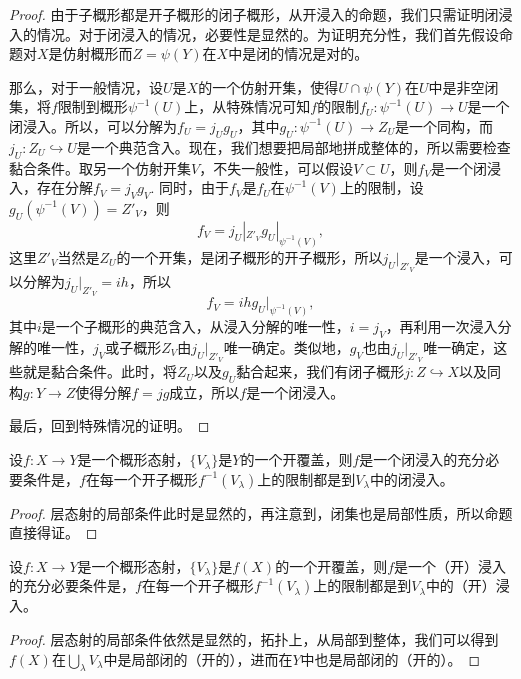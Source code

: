 \begin{proof}
由于子概形都是开子概形的闭子概形，从开浸入的命题，我们只需证明闭浸入的情况。对于闭浸入的情况，必要性是显然的。为证明充分性，我们首先假设命题对$X$是仿射概形而$Z=\psi(Y)$在$X$中是闭的情况是对的。

那么，对于一般情况，设$U$是$X$的一个仿射开集，使得$U\cap \psi(Y)$在$U$中是非空闭集，将$f$限制到概形$\psi^{-1}(U)$上，从特殊情况可知$f$的限制$f_U:\psi^{-1}(U)\to U$是一个闭浸入。所以，可以分解为$f_U=j_Ug_U$，其中$g_U:\psi^{-1}(U)\to Z_U$是一个同构，而$j_U:Z_U\hookrightarrow U$是一个典范含入。现在，我们想要把局部地拼成整体的，所以需要检查黏合条件。取另一个仿射开集$V$，不失一般性，可以假设$V\subset U$，则$f_V$是一个闭浸入，存在分解$f_V=j_Vg_V$. 同时，由于$f_V$是$f_U$在$\psi^{-1}(V)$上的限制，设$g_U(\psi^{-1}(V))=Z'_V$，则
\[
	f_V=j_U|_{Z'_V}g_U|_{\psi^{-1}(V)},
\]
这里$Z'_V$当然是$Z_U$的一个开集，是闭子概形的开子概形，所以$j_U|_{Z'_V}$是一个浸入，可以分解为$j_U|_{Z'_V}=ih$，所以
\[
	f_V=ihg_U|_{\psi^{-1}(V)},
\]
其中$i$是一个子概形的典范含入，从浸入分解的唯一性，$i=j_V$，再利用一次浸入分解的唯一性，$j_V$或子概形$Z_V$由$j_U|_{Z'_V}$唯一确定。类似地，$g_V$也由$j_U|_{Z'_V}$唯一确定，这些就是黏合条件。此时，将$Z_U$以及$g_U$黏合起来，我们有闭子概形$j:Z\hookrightarrow X$以及同构$g:Y\to Z$使得分解$f=jg$成立，所以$f$是一个闭浸入。

最后，回到特殊情况的证明。\notprove
\end{proof}

\begin{coro}\label{coro:3.4.12}
设$f:X\to Y$是一个概形态射，$\{V_\lambda\}$是$Y$的一个开覆盖，则$f$是一个闭浸入的充分必要条件是，$f$在每一个开子概形$f^{-1}(V_\lambda)$上的限制都是到$V_\lambda$中的闭浸入。
\end{coro}

\begin{proof}
层态射的局部条件此时是显然的，再注意到，闭集也是局部性质，所以命题直接得证。
\end{proof}

\begin{coro}
设$f:X\to Y$是一个概形态射，$\{V_\lambda\}$是$f(X)$的一个开覆盖，则$f$是一个（开）浸入的充分必要条件是，$f$在每一个开子概形$f^{-1}(V_\lambda)$上的限制都是到$V_\lambda$中的（开）浸入。
\end{coro}

\begin{proof}
层态射的局部条件依然是显然的，拓扑上，从局部到整体，我们可以得到$f(X)$在$\bigcup_\lambda V_\lambda$中是局部闭的（开的），进而在$Y$中也是局部闭的（开的）。
\end{proof}

